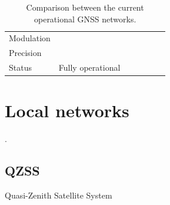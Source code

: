\begin{table}[!h]
\begin{tabular}{lcccccc}
        Modulation                       &                   &                              &                      &                &         &  \\
        Precision                        &                   &                              &                      &                &         &  \\
        Status                           & Fully operational &                              &                      &                &         &  \\
        \bottomrule[1.5pt]
    \end{tabular}
    \caption{Comparison between the current operational GNSS networks.}
    \label{tab:networks-comparison}
\end{table}


\section{Local networks}

.

\subsection{QZSS}

Quasi-Zenith Satellite System \cite{qzss}

